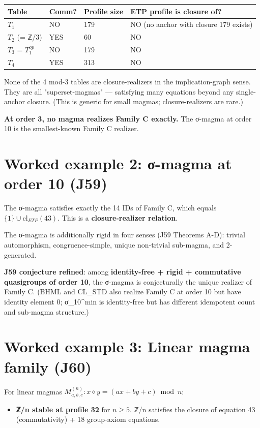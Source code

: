\documentclass[11pt,reqno]{amsart}
\theoremstyle{plain}
\theoremstyle{definition}
\begin{document}
\begin{center}
\begin{tabular}{llll}
\toprule
Table & Comm? & Profile size & ETP profile is closure of? \\
\midrule
$T_1$ & NO & 179 & NO (no anchor with closure 179 exists) \\
$T_2$ (= ℤ/3) & YES & 60 & NO \\
$T_3$ = $T_1^{op}$ & NO & 179 & NO \\
$T_4$ & YES & 313 & NO \\
\bottomrule
\end{tabular}
\end{center}

None of the 4 mod-3 tables are closure-realizers in the implication-graph sense. They are all "superset-magmas" --- satisfying many equations beyond any single-anchor closure. (This is generic for small magmas; closure-realizers are rare.)

\textbf{At order 3, no magma realizes Family C exactly.} The σ-magma at order 10 is the smallest-known Family C realizer.

\section{Worked example 2: σ-magma at order 10 (J59)}

The σ-magma satisfies exactly the 14 IDs of Family C, which equals $\{1\} \cup \mathrm{cl}_{ETP}(43)$. This is a \textbf{closure-realizer relation}.

The σ-magma is additionally rigid in four senses (J59 Theorems A-D): trivial automorphism, congruence-simple, unique non-trivial sub-magma, and 2-generated.

\textbf{J59 conjecture refined}: among \textbf{identity-free + rigid + commutative quasigroups of order 10}, the σ-magma is conjecturally the unique realizer of Family C. (BHML and CL_STD also realize Family C at order 10 but have identity element 0; σ_10^min is identity-free but has different idempotent count and sub-magma structure.)

\section{Worked example 3: Linear magma family (J60)}

For linear magmas $M_{a, b, c}^{(n)} : x \diamond y = (ax + by + c) \bmod n$:

\begin{itemize}
\item \textbf{ℤ/n stable at profile 32} for $n \geq 5$. ℤ/n satisfies the closure of equation 43 (commutativity) + 18 group-axiom equations.
\end{itemize}
\end{document}
